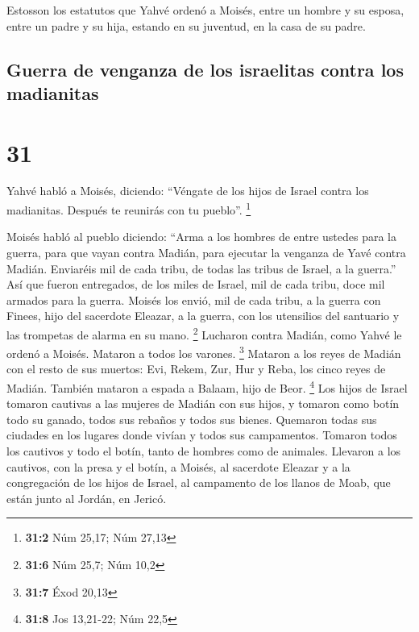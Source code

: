  Estosson los estatutos que Yahvé ordenó a Moisés, entre
un hombre y su esposa, entre un padre y su hija, estando en su juventud,
en la casa de su padre.

\hypertarget{guerra-de-venganza-de-los-israelitas-contra-los-madianitas}{%
\subsection{Guerra de venganza de los israelitas contra los
madianitas}\label{guerra-de-venganza-de-los-israelitas-contra-los-madianitas}}

\hypertarget{section-30}{%
\section{31}\label{section-30}}

 Yahvé habló a Moisés, diciendo:  ``Véngate
de los hijos de Israel contra los madianitas. Después te reunirás con tu
pueblo''. \footnote{\textbf{31:2} Núm 25,17; Núm 27,13}

 Moisés habló al pueblo diciendo: ``Arma a los hombres de
entre ustedes para la guerra, para que vayan contra Madián, para
ejecutar la venganza de Yavé contra Madián.  Enviaréis mil
de cada tribu, de todas las tribus de Israel, a la guerra.''
 Así que fueron entregados, de los miles de Israel, mil de
cada tribu, doce mil armados para la guerra.  Moisés los
envió, mil de cada tribu, a la guerra con Finees, hijo del sacerdote
Eleazar, a la guerra, con los utensilios del santuario y las trompetas
de alarma en su mano. \footnote{\textbf{31:6} Núm 25,7; Núm 10,2}
 Lucharon contra Madián, como Yahvé le ordenó a Moisés.
Mataron a todos los varones. \footnote{\textbf{31:7} Éxod 20,13}
 Mataron a los reyes de Madián con el resto de sus
muertos: Evi, Rekem, Zur, Hur y Reba, los cinco reyes de Madián. También
mataron a espada a Balaam, hijo de Beor. \footnote{\textbf{31:8} Jos
  13,21-22; Núm 22,5}  Los hijos de Israel tomaron
cautivas a las mujeres de Madián con sus hijos, y tomaron como botín
todo su ganado, todos sus rebaños y todos sus bienes. 
Quemaron todas sus ciudades en los lugares donde vivían y todos sus
campamentos.  Tomaron todos los cautivos y todo el botín,
tanto de hombres como de animales.  Llevaron a los
cautivos, con la presa y el botín, a Moisés, al sacerdote Eleazar y a la
congregación de los hijos de Israel, al campamento de los llanos de
Moab, que están junto al Jordán, en Jericó.

